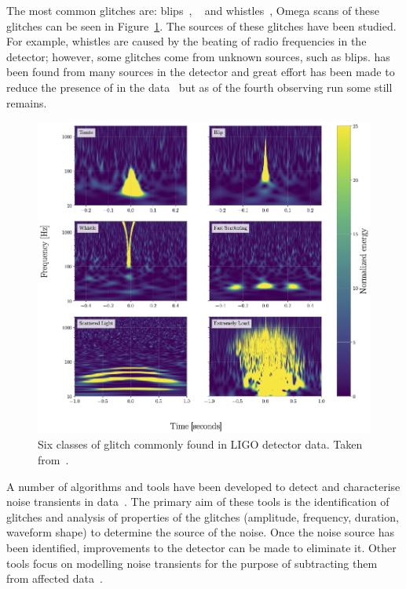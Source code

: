 The most common glitches are: blips~\cite{blips:2019}, \scl~\cite{ArchEnemy:2023} and whistles~\cite{glitschen:2021}, Omega scans of these glitches can be seen in Figure~\ref{3:fig:glitches_subset}. The sources of these glitches have been studied. For example, whistles are caused by the beating of radio frequencies in the detector; however, some glitches come from unknown sources, such as blips. \Scl has been found from many sources in the detector and great effort has been made to reduce the presence of \scl in the data~\cite{reducing_scattering:2020} but as of the fourth observing run some \scl still remains.
%
\begin{figure}
    \centering
    \includegraphics[width=1.0\linewidth]{images/3_detector_characterisation/glitches_subset.png}
    \caption{Six classes of glitch commonly found in LIGO detector data. Taken from~\cite{GlitchPlot:2024, gravityspy:2023}.}
    \label{3:fig:glitches_subset}
\end{figure}
%


A number of algorithms and tools have been developed to detect and characterise noise transients in \gwadj data~\cite{ArchEnemy:2023, reducing_scattering:2020, Glanzer:2023, gravityspy:2017, gravityspy:2021, gravityspy:2023, glitschen:2021,  BayesWave:2015, gwadaptive:2022, O3_subtraction:2022, Powell:2016, glitschen:2021}. The primary aim of these tools is the identification of glitches and analysis of properties of the glitches (amplitude, frequency, duration, waveform shape) to determine the source of the noise. Once the noise source has been identified, improvements to the detector can be made to eliminate it. Other tools focus on modelling noise transients for the purpose of subtracting them from affected \gwadj data~\cite{ArchEnemy:2023, BayesWave:2015, glitschen:2021, antiglitch:2023}.
%
%


